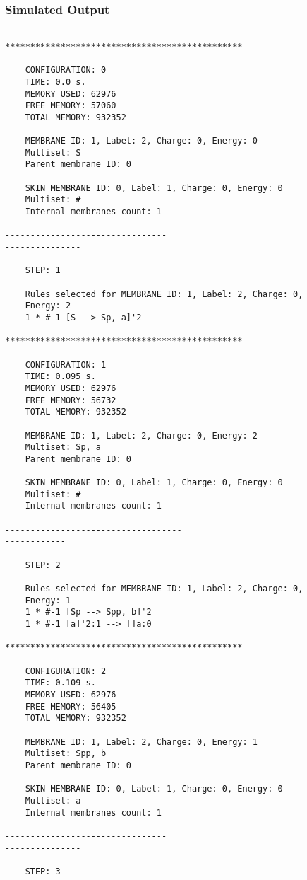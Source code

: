 \documentclass{acm_proc_article-sp}
\begin{document}
\subsubsection{Simulated Output}
\begin{lstlisting}

***********************************************

    CONFIGURATION: 0
    TIME: 0.0 s.
    MEMORY USED: 62976
    FREE MEMORY: 57060
    TOTAL MEMORY: 932352

    MEMBRANE ID: 1, Label: 2, Charge: 0, Energy: 0
    Multiset: S
    Parent membrane ID: 0

    SKIN MEMBRANE ID: 0, Label: 1, Charge: 0, Energy: 0
    Multiset: #
    Internal membranes count: 1

--------------------------------
---------------

    STEP: 1

    Rules selected for MEMBRANE ID: 1, Label: 2, Charge: 0, 
    Energy: 2
    1 * #-1 [S --> Sp, a]'2

***********************************************

    CONFIGURATION: 1
    TIME: 0.095 s.
    MEMORY USED: 62976
    FREE MEMORY: 56732
    TOTAL MEMORY: 932352

    MEMBRANE ID: 1, Label: 2, Charge: 0, Energy: 2
    Multiset: Sp, a
    Parent membrane ID: 0

    SKIN MEMBRANE ID: 0, Label: 1, Charge: 0, Energy: 0
    Multiset: #
    Internal membranes count: 1

-----------------------------------
------------

    STEP: 2

    Rules selected for MEMBRANE ID: 1, Label: 2, Charge: 0, 
    Energy: 1
    1 * #-1 [Sp --> Spp, b]'2
    1 * #-1 [a]'2:1 --> []a:0

***********************************************

    CONFIGURATION: 2
    TIME: 0.109 s.
    MEMORY USED: 62976
    FREE MEMORY: 56405
    TOTAL MEMORY: 932352

    MEMBRANE ID: 1, Label: 2, Charge: 0, Energy: 1
    Multiset: Spp, b
    Parent membrane ID: 0

    SKIN MEMBRANE ID: 0, Label: 1, Charge: 0, Energy: 0
    Multiset: a
    Internal membranes count: 1

--------------------------------
---------------

    STEP: 3


\end{lstlisting}
\end{document}

